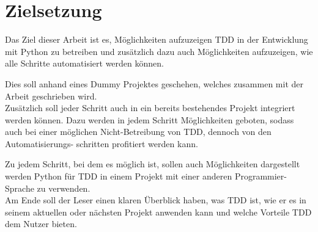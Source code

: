 \section{Zielsetzung}
Das Ziel dieser Arbeit ist es, Möglichkeiten aufzuzeigen TDD in der Entwicklung
mit Python zu betreiben und zusätzlich dazu auch Möglichkeiten aufzuzeigen, wie
alle Schritte automatisiert werden können.

Dies soll anhand eines Dummy Projektes geschehen, welches zusammen mit der Arbeit
geschrieben wird.
\newline
\\
Zusätzlich soll jeder Schritt auch in ein bereits bestehendes Projekt integriert
werden können. Dazu werden in jedem Schritt Möglichkeiten geboten, sodass
auch bei einer möglichen Nicht-Betreibung von TDD, dennoch von den Automatisierungs-
schritten profitiert werden kann.

Zu jedem Schritt, bei dem es möglich ist, sollen auch Möglichkeiten dargestellt werden
Python für TDD in einem Projekt mit einer anderen Programmier-Sprache zu verwenden.
\newline
\\
Am Ende soll der Leser einen klaren Überblick haben, was TDD ist, wie er es in
seinem aktuellen oder nächsten Projekt anwenden kann und welche Vorteile TDD
dem Nutzer bieten.
